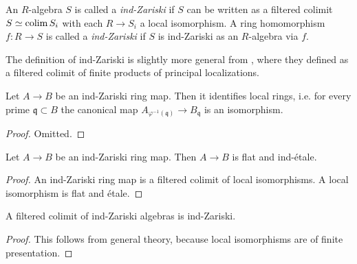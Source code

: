 \begin{definition}
    \label{def:ind-Zariski}
    An $R$-algebra $S$ is called a \emph{ind-Zariski} if $S$ can be written as a filtered colimit $S \simeq \operatorname{colim} S_i$ with each $R \to S_i$ a local isomorphism. A ring homomorphism $f : R \to S$ is called a \emph{ind-Zariski} if $S$ is ind-Zariski as an $R$-algebra via $f$.
\end{definition}

\begin{remark}
  The definition of ind-Zariski is slightly more general from \cite[Definition 2.2.1(iv)]{proetale}, where they defined as a filtered colimit of finite products of principal localizations.
\end{remark}

\begin{lemma}
  Let $A \to B$ be an ind-Zariski ring map. Then it identifies local rings, i.e. for every prime $\mathfrak{q} \subset B$ the canonical map $A_{\varphi^{-1}(\mathfrak{q})} \to B_{\mathfrak{q}}$ is an isomorphism.
  \label{thm:ind-Zariski-identifies-local-rings}
\end{lemma}

\begin{proof}
  Omitted.
\end{proof}

\begin{lemma}
  Let $A \to B$ be an ind-Zariski ring map. Then $A \to B$ is flat and ind-étale.
  \label{thm:ind-Zariski-is-flat-ind-etale}
\end{lemma}

\begin{proof}
  An ind-Zariski ring map is a filtered colimit of local isomorphisms. A local isomorphism is flat and étale.
\end{proof}

\begin{lemma}
    A filtered colimit of ind-Zariski algebras is ind-Zariski.
    \label{lemma:ind-ind-Zariski}
\end{lemma}

\begin{proof}
    This follows from general theory, because local isomorphisms are of finite presentation.
\end{proof}

